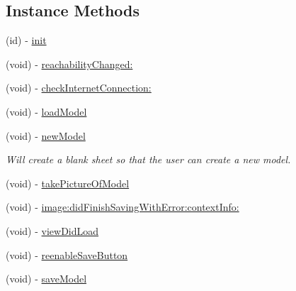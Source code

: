 \subsection*{Instance Methods}
\begin{DoxyCompactItemize}
\item 
(id) -\/ \hyperlink{interface_model_section_view_controller_a4213bb26f5207ee3f402fe463badc691}{init}
\item 
(void) -\/ \hyperlink{interface_model_section_view_controller_aa58593cee765899b690466d15042bf77}{reachability\-Changed\-:}
\item 
(void) -\/ \hyperlink{interface_model_section_view_controller_ab5dd369587af6b3abdd89f312624875f}{check\-Internet\-Connection\-:}
\item 
(void) -\/ \hyperlink{interface_model_section_view_controller_a8331227f39fd462d9e4eb04f06c2a91b}{load\-Model}
\item 
\hypertarget{interface_model_section_view_controller_a6383afe43bdf71c9197a5723793b1fb8}{(void) -\/ \hyperlink{interface_model_section_view_controller_a6383afe43bdf71c9197a5723793b1fb8}{new\-Model}}\label{interface_model_section_view_controller_a6383afe43bdf71c9197a5723793b1fb8}

\begin{DoxyCompactList}\small\item\em Will create a blank sheet so that the user can create a new model. \end{DoxyCompactList}\item 
(void) -\/ \hyperlink{interface_model_section_view_controller_a0052cb4e8c2d69372b8750f3cba55b7f}{take\-Picture\-Of\-Model}
\item 
(void) -\/ \hyperlink{interface_model_section_view_controller_a0910163cad75578d1000ea69340980bf}{image\-:did\-Finish\-Saving\-With\-Error\-:context\-Info\-:}
\item 
(void) -\/ \hyperlink{interface_model_section_view_controller_aa5a50adbd2b567d3a8ae3445329b70d1}{view\-Did\-Load}
\item 
(void) -\/ \hyperlink{interface_model_section_view_controller_a8991afe6ce31445caafbbc84338898c1}{reenable\-Save\-Button}
\item 
\hypertarget{interface_model_section_view_controller_a887a799bad6860d3fd09e0d52cb78d12}{(void) -\/ \hyperlink{interface_model_section_view_controller_a887a799bad6860d3fd09e0d52cb78d12}{save\-Model}}\label{interface_model_section_view_controller_a887a799bad6860d3fd09e0d52cb78d12}


\end{DoxyCompactItemize}

